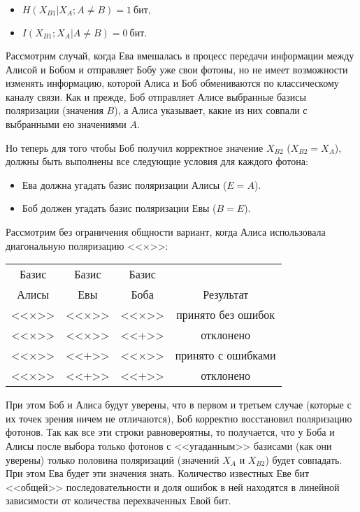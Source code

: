 \begin{itemize}
	\item $H \left( X_{B1} | X_A; A \neq B \right) = 1~\text{бит},$
	\item $I \left( X_{B1} ; X_A | A \neq B \right) = 0~\text{бит}.$
\end{itemize}

Рассмотрим случай, когда Ева вмешалась в процесс передачи информации между Алисой и Бобом и отправляет Бобу уже свои фотоны, но не имеет возможности изменять информацию, которой Алиса и Боб обмениваются по классическому каналу связи. Как и прежде, Боб отправляет Алисе выбранные базисы поляризации (значения $B$), а Алиса указывает, какие из них совпали с выбранными ею значениями $A$.

Но теперь для того чтобы Боб получил корректное значение $X_{B2}$ ($X_{B2} = X_A$), должны быть выполнены все следующие условия для каждого фотона:

\begin{itemize}
	\item Ева должна угадать базис поляризации Алисы ($E = A$).
	\item Боб должен угадать базис поляризации Евы ($B = E$).
\end{itemize}

Рассмотрим без ограничения общности вариант, когда Алиса использовала диагональную поляризацию <<×>>:

\begin{tabular}{ | c | c | c | c | }
\hline
Базис & Базис & Базис & \\
Алисы & Евы & Боба & Результат \\
\hline
<<×>> & <<×>> & <<×>> & принято без ошибок \\
<<×>> & <<×>> & <<+>> & отклонено \\
<<×>> & <<+>> & <<×>> & принято с ошибками\\
<<×>> & <<+>> & <<+>> & отклонено \\
\hline
\end{tabular}

При этом Боб и Алиса будут уверены, что в первом и третьем случае (которые с их точек зрения ничем не отличаются), Боб корректно восстановил поляризацию фотонов. Так как все эти строки равновероятны, то получается, что у Боба и Алисы после выбора только фотонов с <<угаданным>> базисами (как они уверены) только половина поляризаций (значений $X_A$ и $X_{B2}$) будет совпадать. При этом Ева будет эти значения знать. Количество известных Еве бит <<общей>> последовательности и доля ошибок в ней находятся в линейной зависимости от количества перехваченных Евой бит.

